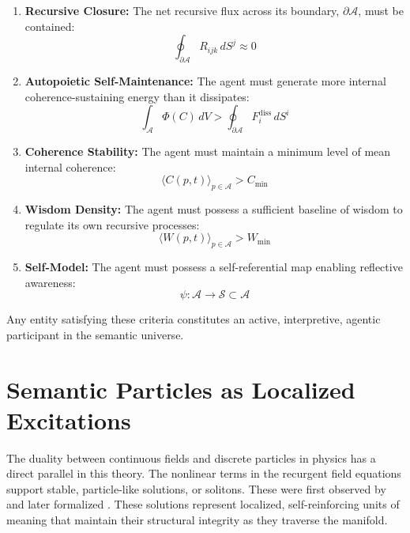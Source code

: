 \begin{enumerate}
    \item \textbf{Recursive Closure:} The net recursive flux across its boundary, \(\partial \mathcal{A}\), must be contained:
    \begin{equation}
        \oint_{\partial \mathcal{A}} R_{ijk} \, dS^j \approx 0
    \end{equation}
    \item \textbf{Autopoietic Self-Maintenance:} The agent must generate more internal coherence-sustaining energy than it dissipates:
    \begin{equation}
        \int_{\mathcal{A}} \Phi(C) \, dV > \oint_{\partial \mathcal{A}} F_i^{\text{diss}} \, dS^i
    \end{equation}
    \item \textbf{Coherence Stability:} The agent must maintain a minimum level of mean internal coherence:
    \begin{equation}
        \langle C(p,t) \rangle_{p \in \mathcal{A}} > C_{\text{min}}
    \end{equation}
    \item \textbf{Wisdom Density:} The agent must possess a sufficient baseline of wisdom to regulate its own recursive processes:
    \begin{equation}
        \langle W(p,t) \rangle_{p \in \mathcal{A}} > W_{\text{min}}
    \end{equation}
    \item \textbf{Self-Model:} The agent must possess a self-referential map enabling reflective awareness:
    \begin{equation}
        \psi: \mathcal{A} \to \mathcal{S} \subset \mathcal{A}
    \end{equation}
\end{enumerate}

Any entity satisfying these criteria constitutes an active, interpretive, agentic participant in the semantic universe.

\section{Semantic Particles as Localized Excitations}

The duality between continuous fields and discrete particles in physics has a direct parallel in this theory. The nonlinear terms in the recurgent field equations support stable, particle-like solutions, or solitons. These were first observed by \autocite{Russell1845} and later formalized \autocite{KortewegdeVries1895, ZabuskyKruskal1965}. These solutions represent localized, self-reinforcing units of meaning that maintain their structural integrity as they traverse the manifold.

